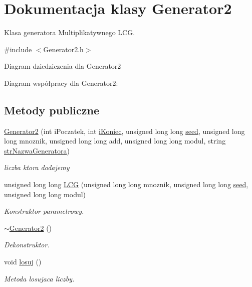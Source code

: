 \hypertarget{classGenerator2}{\section{Dokumentacja klasy Generator2}
\label{classGenerator2}
}


Klasa generatora Multiplikatywnego L\+C\+G.  




{\ttfamily \#include $<$Generator2.\+h$>$}



Diagram dziedziczenia dla Generator2


Diagram współpracy dla Generator2\+:
\subsection*{Metody publiczne}
\begin{DoxyCompactItemize}
\item 
\hyperlink{classGenerator2_a3dfa71293f5dd70d1cf3a30d7676d043}{Generator2} (int i\+Poczatek, int \hyperlink{classGenerator_a235b3d02ce62d19e803cc2295eb7911e}{i\+Koniec}, unsigned long long \hyperlink{classGenerator_ae77446ccb4946b8eb28d0f20f3e4a95f}{seed}, unsigned long long mnoznik, unsigned long long add, unsigned long long modul, string \hyperlink{classGenerator_a7e2c131c26baf31bb3f072115c619d1c}{str\+Nazwa\+Generatora})
\begin{DoxyCompactList}\small\item\em liczba ktora dodajemy \end{DoxyCompactList}\item 
unsigned long long \hyperlink{classGenerator2_a4df292bb376f2ff9ea44721fda384c0a}{L\+C\+G} (unsigned long long mnoznik, unsigned long long \hyperlink{classGenerator_ae77446ccb4946b8eb28d0f20f3e4a95f}{seed}, unsigned long long modul)
\begin{DoxyCompactList}\small\item\em Konstruktor parametrowy. \end{DoxyCompactList}\item 
\hypertarget{classGenerator2_a44a1eb78b1e847318969b476dc22746d}{\hyperlink{classGenerator2_a44a1eb78b1e847318969b476dc22746d}{$\sim$\+Generator2} ()}\label{classGenerator2_a44a1eb78b1e847318969b476dc22746d}

\begin{DoxyCompactList}\small\item\em Dekonstruktor. \end{DoxyCompactList}\item 
void \hyperlink{classGenerator2_a96705c3ab595c06470c3bbb0c24881b0}{losuj} ()
\begin{DoxyCompactList}\small\item\em Metoda losujaca liczby. \end{DoxyCompactList}\end{DoxyCompactItemize}
